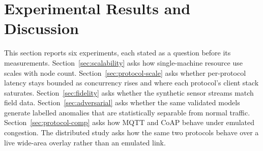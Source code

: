 \documentclass[jsan,article,submit,moreauthors,pdftex]{Definitions/mdpi}
\begin{document}




\section{Experimental Results and Discussion}
\label{sec:Experiment}

This section reports six experiments, each stated as a question before its measurements. Section~\ref{sec:scalability} asks how single-machine resource use scales with node count. Section~\ref{sec:protocol-scale} asks whether per-protocol latency stays bounded as concurrency rises and where each protocol's client stack saturates. Section~\ref{sec:fidelity} asks whether the synthetic sensor streams match field data. Section~\ref{sec:adversarial} asks whether the same validated models generate labelled anomalies that are statistically separable from normal traffic. Section~\ref{sec:protocol-comp} asks how MQTT and CoAP behave under emulated congestion. The distributed study asks how the same two protocols behave over a live wide-area overlay rather than an emulated link.
\end{document}
